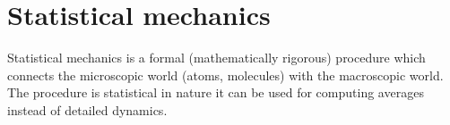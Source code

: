 %
%
%
%
%
%


\section{Statistical mechanics}
\label{sect:SM}
Statistical mechanics is a formal (mathematically rigorous) procedure
which connects the microscopic world (atoms, molecules) with the
macroscopic world. The procedure is statistical in nature \ie it can be
used for computing averages instead of detailed dynamics. 

